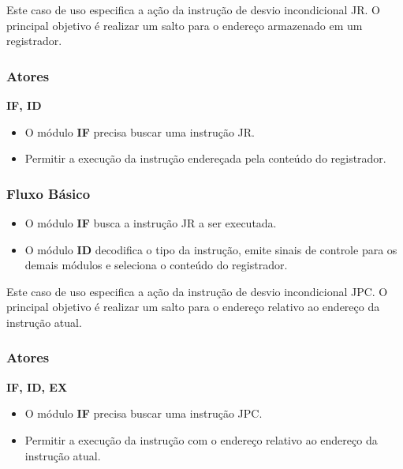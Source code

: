 
Este caso de uso especifica a ação da instrução de desvio incondicional JR. O principal objetivo é realizar um salto para o endereço armazenado em um registrador.
 
\subsubsection*{Atores}
\textbf{IF, ID}

\preconditions 
\begin{itemize}
 \item O módulo \textbf{IF} precisa buscar uma instrução JR.
\end{itemize}

\postconditions
\begin{itemize}
  \item Permitir a execução da instrução endereçada pela conteúdo do registrador.
\end{itemize}

\subsubsection*{Fluxo Básico}
\begin{itemize}
\item O módulo \textbf{IF} busca a instrução JR a ser executada.
\item O módulo \textbf{ID} decodifica o tipo da instrução, emite sinais de controle para os demais módulos e seleciona o conteúdo do registrador.
\end{itemize}


Este caso de uso especifica a ação da instrução de desvio incondicional JPC. O principal objetivo é realizar um salto para o endereço relativo ao endereço da instrução atual.
 
\subsubsection*{Atores}
\textbf{IF, ID, EX}

\preconditions 
\begin{itemize}
 \item O módulo \textbf{IF} precisa buscar uma instrução JPC.
\end{itemize}

\postconditions
\begin{itemize}
  \item Permitir a execução da instrução com o endereço relativo ao endereço da instrução atual.
\end{itemize}

